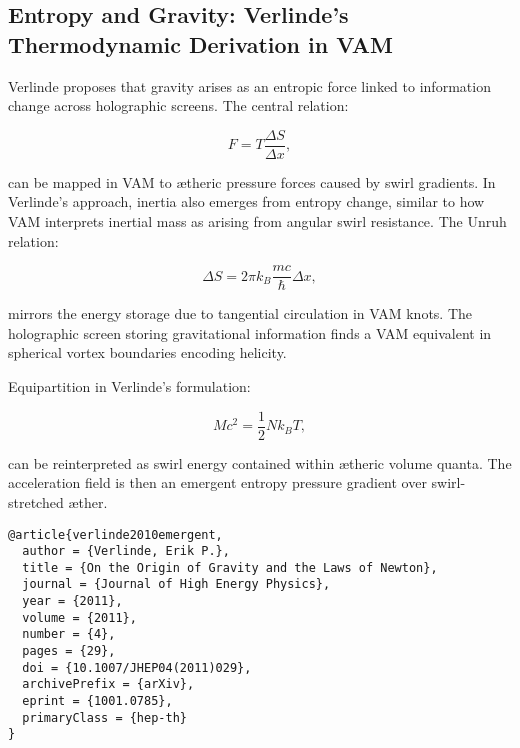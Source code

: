 
\subsection{Entropy and Gravity: Verlinde's Thermodynamic Derivation in VAM}

Verlinde \cite{verlinde2010emergent} proposes that gravity arises as an entropic force linked to information change across holographic screens. The central relation:

\begin{equation}
F = T \frac{\Delta S}{\Delta x},
\end{equation}

can be mapped in VAM to ætheric pressure forces caused by swirl gradients. In Verlinde's approach, inertia also emerges from entropy change, similar to how VAM interprets inertial mass as arising from angular swirl resistance. The Unruh relation:

\begin{equation}
\Delta S = 2\pi k_B \frac{mc}{\hbar} \Delta x,
\end{equation}

mirrors the energy storage due to tangential circulation in VAM knots. The holographic screen storing gravitational information finds a VAM equivalent in spherical vortex boundaries encoding helicity.

Equipartition in Verlinde's formulation:

\begin{equation}
M c^2 = \frac{1}{2} N k_B T,
\end{equation}

can be reinterpreted as swirl energy contained within ætheric volume quanta. The acceleration field is then an emergent entropy pressure gradient over swirl-stretched æther.

\begin{verbatim}
@article{verlinde2010emergent,
  author = {Verlinde, Erik P.},
  title = {On the Origin of Gravity and the Laws of Newton},
  journal = {Journal of High Energy Physics},
  year = {2011},
  volume = {2011},
  number = {4},
  pages = {29},
  doi = {10.1007/JHEP04(2011)029},
  archivePrefix = {arXiv},
  eprint = {1001.0785},
  primaryClass = {hep-th}
}
\end{verbatim}

